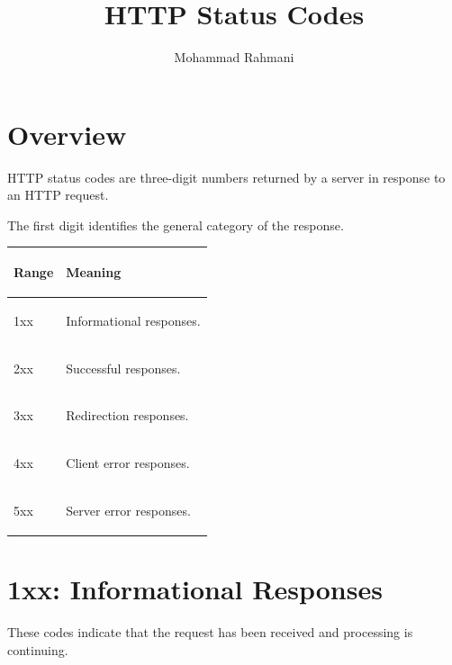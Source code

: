 \documentclass[a4paper]{article}
\title{HTTP Status Codes}
\date{}
\author{Mohammad Rahmani}
\begin{document}
    
    \maketitle
    
    \tableofcontents
    \newpage
    
    
    \section{Overview}
        
        HTTP status codes are three-digit numbers returned by a server in response
        to an HTTP request.
        
        The first digit identifies the general category of the response.
        
        \begin{center}
            
            \renewcommand{\arraystretch}{1.3}
            
            \begin{tabularx}{0.8\linewidth}{
                    >{\ttfamily\bfseries\raggedright\arraybackslash}p{2cm}
                    >{\raggedright\arraybackslash}X
            }
\rowcolor{headerblue}
\textnormal{\textbf{Range}} &
\textbf{Meaning} \\
\midrule

1xx &
Informational responses. \\

2xx &
Successful responses. \\

3xx &
Redirection responses. \\

4xx &
Client error responses. \\

5xx &
Server error responses. \\

\bottomrule
            \end{tabularx}
        
        \end{center}
    
    
    \section{1xx: Informational Responses}
        
        These codes indicate that the request has been received and processing is
        continuing.
        
\end{document}
